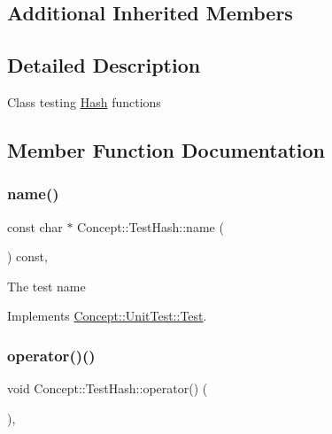 \subsection*{Additional Inherited Members}


\subsection{Detailed Description}
Class testing \mbox{\hyperlink{class_concept_1_1_hash}{Hash}} functions 

\subsection{Member Function Documentation}
\mbox{\label{class_concept_1_1_test_hash_a5bfa2f26b227562240a70d23f1df2018}} 
\subsubsection{\texorpdfstring{name()}{name()}}
{\footnotesize\ttfamily const char $\ast$ Concept\+::\+Test\+Hash\+::name (\begin{DoxyParamCaption}{ }\end{DoxyParamCaption}) const\hspace{0.3cm}{\ttfamily [override]}, {\ttfamily [virtual]}}

The test name 

Implements \mbox{\hyperlink{class_concept_1_1_unit_test_1_1_test_a28c0cddd9719cd456fa92a142ae6c59d}{Concept\+::\+Unit\+Test\+::\+Test}}.

\mbox{\label{class_concept_1_1_test_hash_aaa06219ede091614bb050ede4f8676f0}} 
\subsubsection{\texorpdfstring{operator()()}{operator()()}}
{\footnotesize\ttfamily void Concept\+::\+Test\+Hash\+::operator() (\begin{DoxyParamCaption}{ }\end{DoxyParamCaption})\hspace{0.3cm}{\ttfamily [override]}, {\ttfamily [virtual]}}

